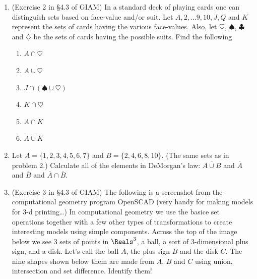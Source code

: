 \documentclass{amsart}
\begin{document}
\begin{enumerate}
\item (Exercise 2 in \S 4.3 of GIAM) In a standard deck of playing cards one can distinguish sets
based on face-value and/or suit.  Let $A, 2, \ldots 9, 10, J, Q$ and $K$
represent the sets of cards having the various face-values.  Also, let
$\heartsuit$, $\spadesuit$, $\clubsuit$ and $\diamondsuit$ be the 
sets of cards having the possible suits.  Find the following
  \begin{enumerate}
  \item \rule[-18pt]{0pt}{48pt}$A \cap \heartsuit$ 
  \item \rule[-18pt]{0pt}{48pt}$A \cup \heartsuit$ 
  \item \rule[-18pt]{0pt}{48pt}$J \cap (\spadesuit \cup \heartsuit)$ 
  \item \rule[-18pt]{0pt}{48pt}$K \cap \heartsuit$ 
  \item \rule[-18pt]{0pt}{48pt}$A \cap K$ 
  \item \rule[-18pt]{0pt}{48pt}$A \cup K$ 
  \end{enumerate}

\vspace{.7in}

\item Let $A = \{1, 2, 3, 4, 5, 6, 7 \}$ and $B = \{2, 4, 6, 8, 10\}$. (The same sets as in problem 2.)  Calculate all of the elements in DeMorgan's law: $\overline{A \cup B}$ and $\overline{A}$ and $\overline{B}$ and $\overline{A} \cap \overline{B}$.

\vfill

\newpage

\item (Exercise 3 in \S 4.3 of GIAM) The following is a screenshot from the computational geometry program OpenSCAD (very handy for making models for 3-d printing\ldots)  In computational geometry we use the basice set operations together
with a few other types of transformations to create interesting models using simple components.  Across the top of the image below we see 3 sets of points in $\Reals^3$, a ball, a sort of 3-dimensional plus sign, and a disk.  Let's call the ball $A$, the plus sign $B$ and the disk $C$.   The nine shapes shown below them are made from $A$, $B$ and $C$ using union, intersection and set difference.  Identify them!


\end{enumerate}
\end{document}
